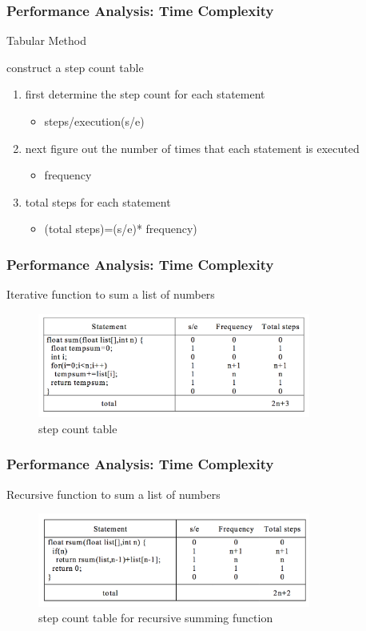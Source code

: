 \documentclass[newPxFont,sthlmFooter,nooffset]{beamer}
\begin{document}
\begin{frame}[t]
  \frametitle{Performance Analysis: Time Complexity}
Tabular Method

construct a step count table
\begin{enumerate}
\item first determine the step count for each statement
  \begin{itemize}
  \item steps/execution(s/e)
  \end{itemize}

\item next figure out the number of times that
  each statement is executed
  \begin{itemize}
  \item frequency
  \end{itemize}

\item total steps for each
  statement
  \begin{itemize}
  \item (total steps)=(s/e)* frequency)
  \end{itemize}

\end{enumerate}

\end{frame}


\begin{frame}[t]
  \frametitle{Performance Analysis: Time Complexity}
Iterative function to sum a list of numbers
  \begin{figure}[h]
    \centering
    \includegraphics[width=0.8\textwidth]{figures/fig01_iter.png}
    \caption{step count table}
  \end{figure}
\end{frame}

\begin{frame}[t]
  \frametitle{Performance Analysis: Time Complexity}
Recursive function to sum a list of numbers
  \begin{figure}[h]
    \centering
    \includegraphics[width=0.8\textwidth]{figures/fig02_recur.png}
    \caption{step count table for recursive summing function}
  \end{figure}
\end{frame}
\end{document}
